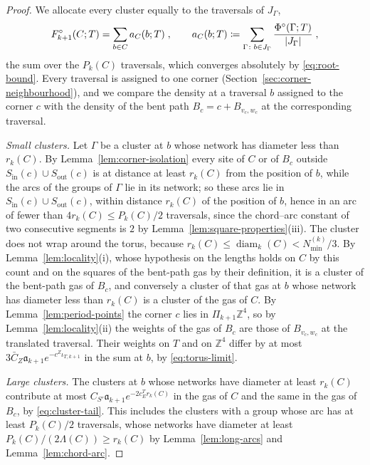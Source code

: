 \documentclass[11pt]{preprint}
\newcommand{\diam}{\operatorname{diam}}
\DeclarePairedDelimiter{\abs}{\lvert}{\rvert}
\numberwithin{equation}{section}
\theoremstyle{definition}
\theoremstyle{remark}
\theoremstyle{plain}
\begin{document}
\begin{proof}
We allocate every cluster equally to the traversals of $J_\Gamma$,
\begin{equation}\label{eq:allocation}
    F^\circ_{k+1}(C; T) = \sum_{b \in C}a_C(b; T)\;,
    \qquad
    a_C(b; T) \coloneqq \sum_{\Gamma\colon b \in J_\Gamma}\frac{\Phi^\circ(\Gamma; T)}{\abs{J_\Gamma}}\;,
\end{equation}
the sum over the $P_k(C)$ traversals, which converges absolutely by \eqref{eq:root-bound}. Every traversal is assigned to one corner (Section~\ref{sec:corner-neighbourhood}), and we compare the density at a traversal $b$ assigned to the corner $c$ with the density of the bent path $B_c = c + B_{v_c,w_c}$ at the corresponding traversal.

\emph{Small clusters.} Let $\Gamma$ be a cluster at $b$ whose network has diameter less than $r_k(C)$. By Lemma~\ref{lem:corner-isolation} every site of $C$ or of $B_c$ outside $S_{\mathrm{in}}(c) \cup S_{\mathrm{out}}(c)$ is at distance at least $r_k(C)$ from the position of $b$, while the arcs of the groups of $\Gamma$ lie in its network; so these arcs lie in $S_{\mathrm{in}}(c) \cup S_{\mathrm{out}}(c)$, within distance $r_k(C)$ of the position of $b$, hence in an arc of fewer than $4r_k(C) \leq P_k(C)/2$ traversals, since the chord--arc constant of two consecutive segments is $2$ by Lemma~\ref{lem:square-properties}(iii). The cluster does not wrap around the torus, because $r_k(C) \leq \diam_k(C) < N^{(k)}_{\min}/3$. By Lemma~\ref{lem:locality}(i), whose hypothesis on the lengths holds on $C$ by this count and on the squares of the bent-path gas by their definition, it is a cluster of the bent-path gas of $B_c$, and conversely a cluster of that gas at $b$ whose network has diameter less than $r_k(C)$ is a cluster of the gas of $C$. By Lemma~\ref{lem:period-points} the corner $c$ lies in $\Pi_{k+1}\mathbb Z^4$, so by Lemma~\ref{lem:locality}(ii) the weights of the gas of $B_c$ are those of $B_{v_c,w_c}$ at the translated traversal. Their weights on $T$ and on $\mathbb Z^4$ differ by at most $3\bar C_Z\mathfrak a_{k+1}e^{-c^Z\iota_{T,k+1}}$ in the sum at $b$, by \eqref{eq:torus-limit}.

\emph{Large clusters.} The clusters at $b$ whose networks have diameter at least $r_k(C)$ contribute at most $C_{S'}\mathfrak a_{k+1}e^{-2c^T_Er_k(C)}$ in the gas of $C$ and the same in the gas of $B_c$, by \eqref{eq:cluster-tail}. This includes the clusters with a group whose arc has at least $P_k(C)/2$ traversals, whose networks have diameter at least $P_k(C)/(2\Lambda(C)) \geq r_k(C)$ by Lemma~\ref{lem:long-arcs} and Lemma~\ref{lem:chord-arc}.


\end{proof}
\end{document}
